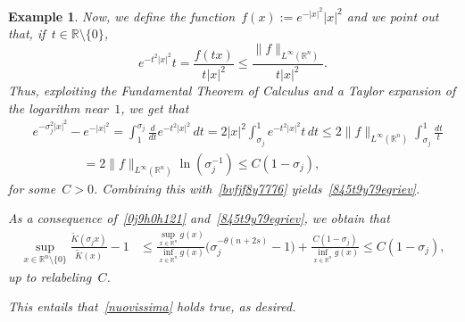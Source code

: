 \documentclass[10pt,a4paper]{amsart}
\newtheorem{example}[theorem]{Example}
\numberwithin{equation}{section}
\newcommand{\R}{\mathbb{R}}
\begin{document}
\begin{example}
{Now, we define the function~$f(x):= e^{-| x |^2} | x |^2$ and we point out that, if~$t \in \R \setminus \{0\}$,
$$
e^{-t^2 | x |^2}t= \frac{f(tx)}{t | x|^2} \leq \frac{\| f \|_{L^{\infty}(\R^n)}}{t | x |^2}.
$$
Thus, exploiting the Fundamental Theorem of Calculus and a Taylor expansion of the logarithm near~$1$, we get that
\begin{equation*}
\begin{split}&
 e^{-\sigma_j^2 | x |^2} -e^{-| x|^2} = \int_1^{\sigma_j} \frac{d}{dt}e^{-t^2 |x|^2} \, dt  = 2 |x|^2 \int_{\sigma_j}^1 e^{-t^2 |x|^2}t \, dt \leq 2 \|f\|_{L^{\infty}(\R^n)} \int_{\sigma_j}^1 \frac{dt}{t} \\
&\qquad\qquad= 2 \|f\|_{L^{\infty}(\R^n)} \ln(\sigma_j^{-1}) \leq C (1-\sigma_j),
\end{split}
\end{equation*}
for some~$C>0$. Combining this with~\eqref{bvfjf8y7776} yields~\eqref{845t9y79egriev}.

As a consequence of~\eqref{0j9h0h121} and~\eqref{845t9y79egriev}, we obtain that
\begin{equation*}
\begin{split}
\sup_{x \in \R^n \setminus \{0\}} \frac{\widetilde{K}(\sigma_jx)}{\widetilde{K}(x)}-1 &\leq \frac{\displaystyle\sup_{x \in\R^n} g(x)}{\displaystyle\inf_{x\in\R^n} g(x)} \big(\sigma_j^{-\theta(n+2s)} -1\big) + \frac{C (1-\sigma_j)}{\displaystyle\inf_{x\in\R^n} g(x)} \leq C (1-\sigma_j),
\end{split}
\end{equation*}
up to relabeling~$C$. 

This entails that~\eqref{nuovissima} holds true, as desired.}
\end{example}
\end{document}
